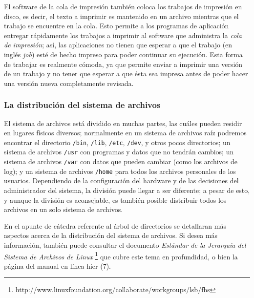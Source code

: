 \documentclass[12pt]{article}
\begin{document}
 El software de la cola de impresión también coloca los trabajos de
impresión en disco, es decir, el texto a imprimir es mantenido en un archivo
mientras que el trabajo se encuentre en la cola. Esto permite a los programas de
aplicación entregar rápidamente los trabajos a imprimir al software que
administra la \textit{cola de impresión}; así, las aplicaciones no
tienen que esperar a que el trabajo (en inglés \textit{job}) esté de hecho impreso para
poder continuar su ejecución. Esta forma de trabajar es realmente cómoda, ya que
permite enviar a imprimir una versión de un trabajo y no tener que esperar a que
ésta sea impresa antes de poder hacer una versión nueva completamente revisada.




\subsubsection{ La distribución del sistema de archivos}



 El sistema de archivos está dividido en muchas partes, las cuáles pueden residir
en lugares físicos diversos; normalmente en un sistema de archivos raíz podremos 
encontrar el directorio \texttt{/bin}, \texttt{/lib}, \texttt{/etc}, \texttt{/dev},
y otros pocos directorios; un sistema de archivos \texttt{/usr} con programas y datos que
no tendrán cambios; un sistema de archivos \texttt{/var} con datos que pueden cambiar
(como los archivos de log); y un sistema de archivos \texttt{/home}
para todos los archivos personales de los usuarios. Dependiendo de la
configuración del hardware y de las decisiones del administrador del sistema, la
división puede llegar a ser diferente; a pesar de esto, y aunque la división es
aconsejable, es también posible distribuir todos los archivos en un solo sistema
de archivos.  

 En el apunte de cátedra referente al árbol de directorios se detallaran más 
aspectos acerca de la distribución del sistema de archivos. Si desea más información,
también puede consultar el documento \textit{Estándar de la Jerarquía del Sistema de Archivos
de Linux} 
\footnote{http://www.linuxfoundation.org/collaborate/workgroups/lsb/fhs}
que cubre este tema en profundidad, o bien la página del manual en línea hier (7).


\end{document}
